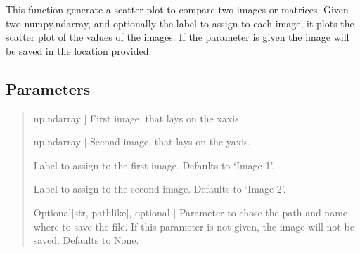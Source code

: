 \documentclass[letterpaper,10pt,english]{sphinxmanual}
\begin{document}
\begin{fulllineitems}
\label{\detokenize{index:hicanalysis.visualizegraph.scatter_plot}}
\pysigstartsignatures
{}
\pysigstopsignatures
\sphinxAtStartPar
This function generate a scatter plot to compare two images or matrices. Given 
two numpy.ndarray, and optionally the label to assign to each image, it plots 
the scatter plot of the values of the images. If the parameter  is 
given the image will be saved in the location provided.


\subsection{Parameters}
\label{\detokenize{index:id18}}\begin{quote}
\begin{description}
\sphinxlineitem{image1}{[}np.ndarray {]}
\sphinxAtStartPar
First image, that lays on the x\sphinxhyphen{}axis.

\sphinxlineitem{image2}{[}np.ndarray  {]}
\sphinxAtStartPar
Second image, that lays on the y\sphinxhyphen{}axis.

\sphinxAtStartPar
Label to assign to the first image. Defaults to ‘Image 1’.

\sphinxAtStartPar
Label to assign to the second image. Defaults to ‘Image 2’.

\sphinxlineitem{savepath}{[}Optional{[}str, path\sphinxhyphen{}like{]}, optional  {]}
\sphinxAtStartPar
Parameter to chose the path and name where to save the file. If this
parameter is not given, the image will not be saved. Defaults to None.

\end{description}
\end{quote}

\end{fulllineitems}
\end{document}
